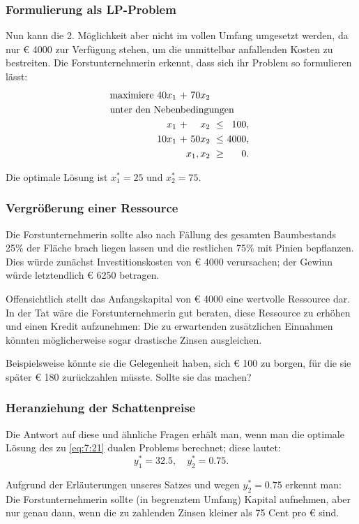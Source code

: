 \documentclass[smaller]{beamer}
\begin{document}
\begin{frame}
 \frametitle{Formulierung als LP-Problem}
 Nun kann die 2. Möglichkeit aber nicht im vollen Umfang umgesetzt werden, da nur \alert{{\euro} 4000} zur Verfügung stehen, um die unmittelbar anfallenden Kosten zu bestreiten. Die Forstunternehmerin erkennt, dass sich ihr Problem so formulieren lässt:
\begin{align}
\begin{alignedat}{4}
\label{eq:7:21}
& \text{maximiere } & 40x_1 &\ + &\ 70x_2 & & \\
& \rlap{unter den Nebenbedingungen} & & & & & \\
&&   x_1 &\ + &\   x_2 &\ \leq &\  100,\ \\
&& 10x_1 &\ + &\ 50x_2 &\ \leq &\ 4000,\ \\
&& & & \llap{$x_1,x_2$} &\ \geq &\ 0.\
\end{alignedat}
\end{align}

Die optimale Lösung ist \alert{$x_1^* = 25$ und $x_2^*=75$}. 
\end{frame}

\begin{frame}
 \frametitle{Vergrößerung einer Ressource}
 Die Forstunternehmerin sollte also nach Fällung des gesamten Baumbestands 25\% der Fläche brach liegen lassen und die restlichen 75\% mit Pinien bepflanzen. Dies würde zunächst Investitionskosten von {\euro} 4000 verursachen; der Gewinn würde letztendlich {\euro} 6250 betragen. \\ \vspace*{0.2cm}

\alert{Offensichtlich stellt das Anfangskapital von {\euro} 4000 eine wertvolle Ressource dar.} In der Tat wäre die Forstunternehmerin gut beraten, diese Ressource zu erhöhen und einen Kredit aufzunehmen: Die zu erwartenden zusätzlichen Einnahmen könnten möglicherweise sogar drastische Zinsen ausgleichen. \\ \vspace*{0.2cm}

Beispielsweise könnte sie die Gelegenheit haben, sich {\euro} 100 zu borgen, für die sie später {\euro} 180 zurückzahlen müsste. \alert{Sollte sie das machen?}
\end{frame}

\begin{frame}
 \frametitle{Heranziehung der Schattenpreise}
 \alert{Die Antwort auf diese und ähnliche Fragen erhält man, wenn man die optimale Lösung des zu \eqref{eq:7:21} dualen Problems berechnet}; diese lautet:
\[
y_1^* = 32.5, \quad
y_2^* = 0.75.
\]

Aufgrund der Erläuterungen unseres Satzes und wegen $y_2^* = 0.75$ erkennt man: \alert{Die Forstunternehmerin sollte (in begrenztem Umfang) Kapital aufnehmen, aber nur genau dann, wenn die zu zahlenden Zinsen kleiner als 75 Cent pro {\euro} sind.}
\end{frame}
\end{document}
